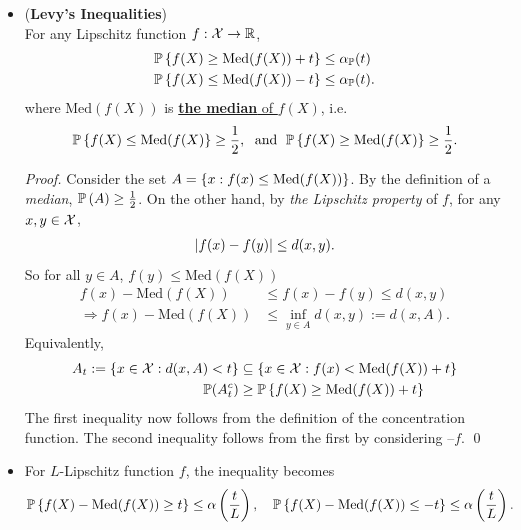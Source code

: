 \documentclass[11pt]{article}
\begin{document}
\begin{itemize}
\item \begin{theorem} (\textbf{Levy's Inequalities})\citep{boucheron2013concentration, wainwright2019high}\\
For any Lipschitz function $f: {\mathcal X} \to {\mathbb R}$, 
\begin{align}
{\mathbb P}\left\{f(X) \ge  \text{Med}(f(X)) + t \right\} &\le \alpha_{{\mathbb P}}(t) \label{ineqn: levy_inequality}\\
{\mathbb P}\left\{f(X)  \le  \text{Med}(f(X))  -  t \right\} &\le \alpha_{{\mathbb P}}(t).  \nonumber
\end{align} where $\text{Med}(f(X))$ is \underline{\textbf{the median} of $f(X)$}, i.e.
\begin{align*}
{\mathbb P}\left\{f(X) \le \text{Med}(f(X)\right\} \ge  \frac{1}{2}, \;\text{ and }\; {\mathbb P}\left\{f(X) \ge \text{Med}(f(X)\right\} \ge  \frac{1}{2}.
\end{align*}
\end{theorem}
\begin{proof} 
Consider the set $A = \left\{x : f(x) \le \text{Med}(f(X))\right\}$. By the definition of a \emph{median},  ${\mathbb P}\left(A\right) \ge \frac{1}{2}$. On the other hand, by \emph{the Lipschitz property} of $f$, for any $x, y \in {\mathcal X}$,
\begin{align*}
\left\lvert f(x) - f(y) \right\rvert \le d(x, y). 
\end{align*} So for all $y \in A$,  $f(y) \le \text{Med}(f(X))$
\begin{align*}
f(x) -  \text{Med}(f(X))  &\le f(x) - f(y) \le d(x, y) \\
\Rightarrow  f(x) -  \text{Med}(f(X))  &\le \inf_{y \in A}d(x, y) := d(x, A).
\end{align*} Equivalently, 
\begin{align*}
A_t := \left\{x \in {\mathcal X}: d(x, A) < t\right\} &\subseteq \left\{x \in {\mathcal X}:  f(x) < \text{Med}(f(X)) + t \right\} \\
{\mathbb P}(A_t^{c}) &\ge {\mathbb P}\left\{ f(X) \ge \text{Med}(f(X)) + t \right\} 
\end{align*} The first inequality now follows from the definition of the concentration function.  The second inequality follows from the first by considering $–f$.  \qed
\end{proof}

\item \begin{remark} For $L$-Lipschitz function $f$, the inequality becomes
\begin{align*}
{\mathbb P}\left\{f(X) - \text{Med}(f(X)) \ge t \right\} \le  \alpha\left(\frac{t}{L}\right), \quad {\mathbb P}\left\{f(X) - \text{Med}(f(X)) \le -t \right\} &\le \alpha\left(\frac{t}{L}\right).
\end{align*}
\end{remark}


\end{itemize}
\end{document}

